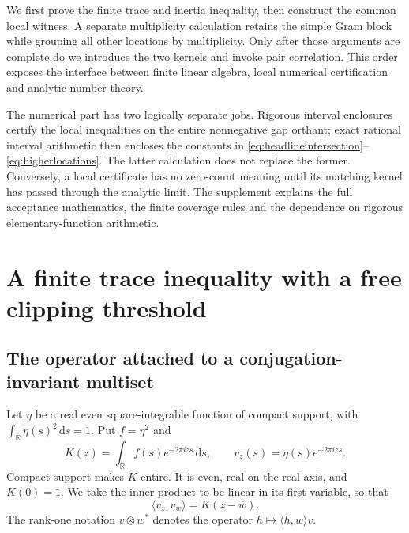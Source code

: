 \documentclass[11pt]{amsart}
\numberwithin{equation}{section}
\newcommand{\R}{\mathbb R}
\newcommand{\dd}{\,\mathrm d}
\begin{document}
We first prove the finite trace and inertia inequality, then construct the
common local witness. A separate multiplicity calculation retains the
simple Gram block while grouping all other locations by multiplicity.
Only after those arguments are complete do we introduce the two kernels
and invoke pair correlation. This order exposes the interface between
finite linear algebra, local numerical certification and analytic number
theory.

The numerical part has two logically separate jobs. Rigorous interval
enclosures certify the local inequalities on the entire nonnegative gap
orthant; exact rational interval arithmetic then encloses the constants
in \eqref{eq:headlineintersection}--\eqref{eq:higherlocations}. The latter
calculation does not replace the former. Conversely, a local certificate
has no zero-count meaning until its matching kernel has passed through the
analytic limit. The supplement explains the full acceptance mathematics,
the finite coverage rules and the dependence on rigorous elementary-function
arithmetic.

\section{A finite trace inequality with a free clipping threshold}
\label{sec:finite}

\subsection{The operator attached to a conjugation-invariant multiset}

Let $\eta$ be a real even square-integrable function of compact support,
with $\int_\R\eta(s)^2\dd s=1$. Put $f=\eta^2$ and
\begin{equation}
 K(z)=\int_\R f(s)e^{-2\pi izs}\dd s,\qquad
 v_z(s)=\eta(s)e^{-2\pi izs}.\label{eq:kernelvectors}
\end{equation}
Compact support makes $K$ entire. It is even, real on the real axis, and
$K(0)=1$. We take the inner product to be linear in its first variable,
so that
\[
 \langle v_z,v_w\rangle=K(z-\overline w).
\]
The rank-one notation $v\otimes w^*$ denotes the operator
$h\mapsto\langle h,w\rangle v$.
\end{document}
